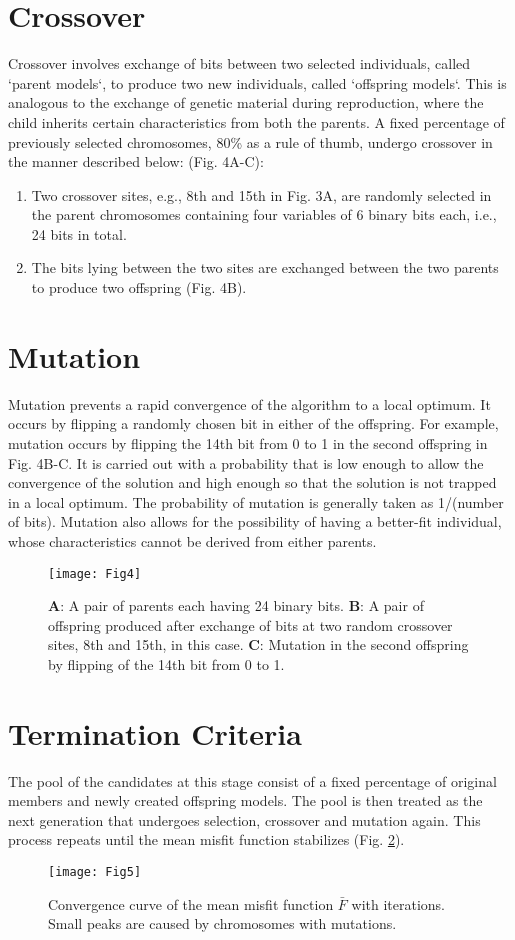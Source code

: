 \section{Crossover}
Crossover involves exchange of bits between two selected individuals, called `parent models`, to produce two new individuals, called `offspring models`. This is analogous to the exchange of genetic material during reproduction, where the child inherits certain characteristics from both the parents. 
A fixed percentage of previously selected chromosomes, 80\% as a rule of thumb, undergo crossover in the manner described below: (Fig. 4A-C):
\renewcommand{\theenumi}{\roman{enumi}}
\begin{enumerate}
    \item Two crossover sites, e.g., 8th and 15th in Fig. 3A, are randomly selected in the parent chromosomes containing four variables of 6 binary bits each, i.e., 24 bits in total.
    \item The bits lying between the two sites are exchanged between the two parents to produce two offspring (Fig. 4B).
\end{enumerate}

\section{Mutation}
Mutation prevents a rapid convergence of the algorithm to a local optimum. It occurs by flipping a randomly chosen bit in either of the offspring. For example, mutation occurs by flipping the 14th bit from 0 to 1 in the second offspring in Fig. 4B-C. It is carried out with a probability that is low enough to allow the convergence of the solution and high enough so that the solution is not trapped in a local optimum. The probability of mutation is generally taken as 1/(number of bits). Mutation also allows for the possibility of having a better-fit individual, whose characteristics cannot be derived from either parents.

\begin{figure}[h]
\centering
\texttt{[image: Fig4]}
\caption{\textbf{A}: A pair of parents each having 24 binary bits. \textbf{B}: A pair of offspring produced after exchange of bits at two random crossover sites, 8th and 15th, in this case. \textbf{C}: Mutation in the second offspring by flipping of the 14th bit from 0 to 1.}
\label{fig4}
\end{figure}

\section{Termination Criteria}
The pool of the candidates at this stage consist of a fixed percentage of original members and newly created offspring models. The pool is then treated as the next generation that undergoes selection, crossover and mutation again. This process repeats until the mean misfit function stabilizes (Fig. \ref{fig5}).

\begin{figure}[H]
\centering
\texttt{[image: Fig5]}
\caption{Convergence curve of the mean misfit function $\bar{F}$ with iterations. Small peaks are caused by chromosomes with mutations.}
\label{fig5}
\end{figure}